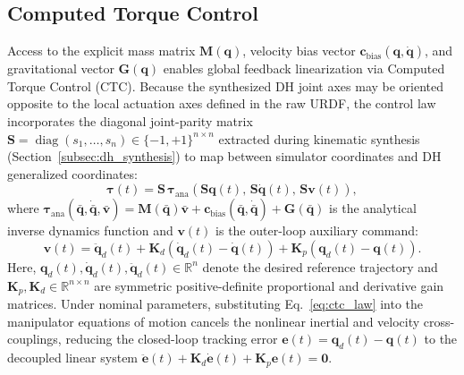 \documentclass[fleqn,10pt]{article}
\begin{document}
\subsection{Computed Torque Control} \label{subsec:ctc}
Access to the explicit mass matrix $\bm{M}(\bm{q})$, velocity bias vector $\mathbf{c}_{\text{bias}}(\bm{q},\dot{\bm{q}})$, and gravitational vector $\bm{G}(\bm{q})$ enables global feedback linearization via Computed Torque Control (CTC). Because the synthesized DH joint axes may be oriented opposite to the local actuation axes defined in the raw URDF, the control law incorporates the diagonal joint-parity matrix $\bm{S} = \operatorname{diag}(s_1, \dots, s_n) \in \{-1, +1\}^{n \times n}$ extracted during kinematic synthesis (Section~\ref{subsec:dh_synthesis}) to map between simulator coordinates and DH generalized coordinates:
\begin{equation}
	\bm{\tau}(t) = \bm{S} \, \bm{\tau}_{\text{ana}}\!\left( \bm{S}\bm{q}(t), \, \bm{S}\dot{\bm{q}}(t), \, \bm{S}\bm{v}(t) \right),
	\label{eq:ctc_law}
\end{equation}
where $\bm{\tau}_{\text{ana}}(\bar{\bm{q}}, \dot{\bar{\bm{q}}}, \bar{\bm{v}}) = \bm{M}(\bar{\bm{q}})\bar{\bm{v}} + \mathbf{c}_{\text{bias}}(\bar{\bm{q}}, \dot{\bar{\bm{q}}}) + \bm{G}(\bar{\bm{q}})$ is the analytical inverse dynamics function and $\bm{v}(t)$ is the outer-loop auxiliary command:
\begin{equation}
	\bm{v}(t) = \ddot{\bm{q}}_d(t) + \bm{K}_d\left(\dot{\bm{q}}_d(t) - \dot{\bm{q}}(t)\right) + \bm{K}_p\left(\bm{q}_d(t) - \bm{q}(t)\right).
	\label{eq:ctc_outer}
\end{equation}
Here, $\bm{q}_d(t), \dot{\bm{q}}_d(t), \ddot{\bm{q}}_d(t) \in \mathbb{R}^n$ denote the desired reference trajectory and $\bm{K}_p, \bm{K}_d \in \mathbb{R}^{n \times n}$ are symmetric positive-definite proportional and derivative gain matrices. Under nominal parameters, substituting Eq.~\eqref{eq:ctc_law} into the manipulator equations of motion cancels the nonlinear inertial and velocity cross-couplings, reducing the closed-loop tracking error $\bm{e}(t) = \bm{q}_d(t) - \bm{q}(t)$ to the decoupled linear system $\ddot{\bm{e}}(t) + \bm{K}_d\dot{\bm{e}}(t) + \bm{K}_p\bm{e}(t) = \bm{0}$.
\end{document}
